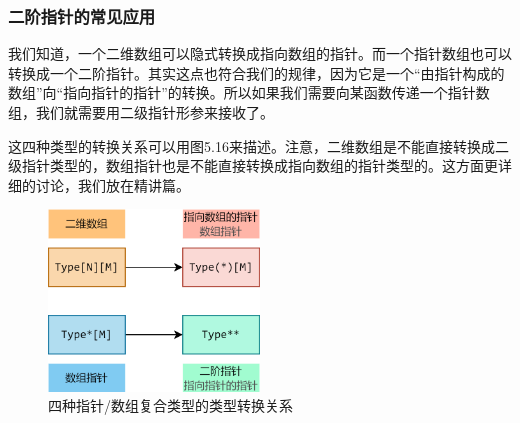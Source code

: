 \subsubsection*{二阶指针的常见应用}
我们知道，一个二维数组可以隐式转换成指向数组的指针。而一个指针数组也可以转换成一个二阶指针。其实这点也符合我们的规律，因为它是一个``由指针构成的数组''向``指向指针的指针''的转换。所以如果我们需要向某函数传递一个指针数组，我们就需要用二级指针形参来接收了。\par
这四种类型的转换关系可以用图5.16来描述。注意，二维数组是不能直接转换成二级指针类型的，数组指针也是不能直接转换成指向数组的指针类型的。这方面更详细的讨论，我们放在精讲篇。\par
\begin{figure}[htbp]
    \centering
    \includegraphics[width=0.5\textwidth]{../images/generalized_parts/05_type_conversions_between_array_and_pointer_300.png}
    \caption{四种指针/数组复合类型的类型转换关系}
\end{figure}\par
